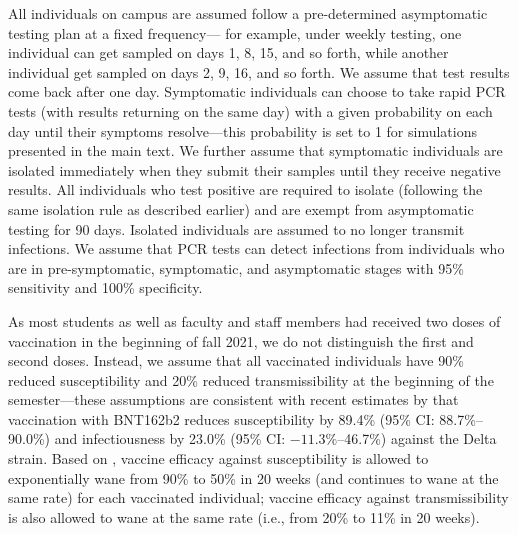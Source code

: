 \documentclass[12pt]{article}
\begin{document}
All individuals on campus are assumed follow a pre-determined asymptomatic testing plan at a fixed frequency---
for example, under weekly testing, one individual can get sampled on days 1, 8, 15, and so forth, while another individual get sampled on days 2, 9, 16, and so forth.
We assume that test results come back after one day.
Symptomatic individuals can choose to take rapid PCR tests (with results returning on the same day) with a given probability on each day until their symptoms resolve---this probability is set to 1 for simulations presented in the main text.
We further assume that symptomatic individuals are isolated immediately when they submit their samples until they receive negative results.
All individuals who test positive are required to isolate (following the same isolation rule as described earlier) and are exempt from asymptomatic testing for 90 days.
Isolated individuals are assumed to no longer transmit infections.
We assume that PCR tests can detect infections from individuals who are in pre-symptomatic, symptomatic, and asymptomatic stages with 95\% sensitivity and 100\% specificity.

As most students as well as faculty and staff members had received two doses of vaccination in the beginning of fall 2021, we do not distinguish the first and second doses.
Instead, we assume that all vaccinated individuals have 90\% reduced susceptibility and 20\% reduced transmissibility at the beginning of the semester---these assumptions are consistent with recent estimates by \citep{prunas2022vaccination} that vaccination with BNT162b2 reduces susceptibility by 89.4\% (95\% CI: 88.7\%--90.0\%) and infectiousness by 23.0\% (95\% CI: $-11.3\%$--46.7\%) against the Delta strain.
Based on \citep{tartof2021effectiveness}, vaccine efficacy against susceptibility is allowed to exponentially wane from 90\% to 50\% in 20 weeks (and continues to wane at the same rate) for each vaccinated individual;
vaccine efficacy against transmissibility is also allowed to wane at the same rate (i.e., from 20\% to 11\% in 20 weeks).
\end{document}
